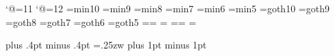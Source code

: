 %
%

\catcode`@=11 %
\def\footnote#1{\let\@sf\empty %
  \ifhmode\edef\@sf{\spacefactor\the\spacefactor}\/\fi
  \nobreak#1\@sf\vfootnote{#1}}
\catcode`@=12 %
%
\font\tenmin=min10 %
\font\preloaded=min9
\font\preloaded=min8
\font\sevenmin=min7
\font\preloaded=min6
\font\fivemin=min5
%
\font\tengt=goth10 %
\font\preloaded=goth9
\font\preloaded=goth8
\font\sevengt=goth7
\font\preloaded=goth6
\font\fivegt=goth5
%
\newfam\minfam %
\newfam\gtfam  %
%
\def\mc{\fam\minfam\tenmin}%
\textfont\minfam=\tenmin\scriptfont\minfam=\sevenmin%
\scriptscriptfont\minfam=\fivemin
%
\def\gt{\fam\gtfam\tengt}%
\textfont\gtfam=\tengt\scriptfont\gtfam=\sevengt%
\scriptscriptfont\gtfam=\fivegt
%

\mc		  %
\kanjiskip=0pt plus .4pt minus .4pt
\xkanjiskip=.25zw plus 1pt minus 1pt
\autospacing\autoxspacing
{}
%
\def\fmtname{jplain}
\def\fmtversion{3.14159 j1.0a}
